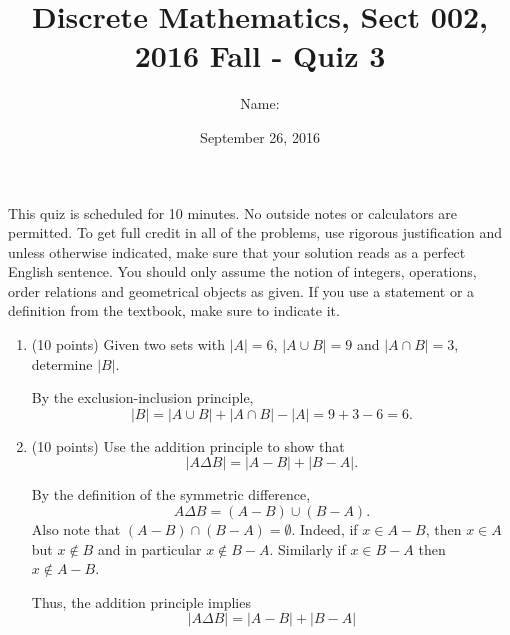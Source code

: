 \documentclass[11pt]{preprint}
\title{Discrete Mathematics, Sect 002, 2016 Fall - Quiz 3}
\author{Name:}
\institute{Courant Institute of Mathematical Sciences, NYU}
\date{September 26, 2016}
\begin{document}
\maketitle

This quiz is scheduled for 10 minutes. No outside notes or calculators are permitted. To get full credit  in all of the problems, use rigorous justification and unless otherwise indicated, make sure that your solution reads as a perfect English sentence. You should only assume the notion of integers, operations, order relations and geometrical objects as given. If you use a statement or a definition from the textbook, make sure to indicate it.
\vspace{0.2cm}

\begin{enumerate}
\item (10 points) Given two sets with $|A|=6$, $|A\cup B|=9$ and $|A\cap B|=3$, determine $|B|$.

\vspace{1cm}

By the exclusion-inclusion principle,
\[
|B|=|A\cup B|+|A\cap B|-|A|=9+3-6=6.
\]
\vspace{1cm}

\item (10 points) Use the addition principle to show that
\[
|A\Delta B|=|A-B|+|B-A|.
\]
\vspace{0.5cm}

By the definition of the symmetric difference,
\[
A\Delta B = (A-B)\cup (B-A).
\]
Also note that $(A-B)\cap(B-A)=\emptyset$. Indeed, if $x\in A-B$, then $x\in A$ but $x\notin B$ and in particular $x\notin B-A$. Similarly if $x\in B-A$ then $x\notin A-B$.

Thus, the addition principle implies
\[
|A\Delta B|=|A-B|+|B-A|
\]

\end{enumerate}
\end{document}
